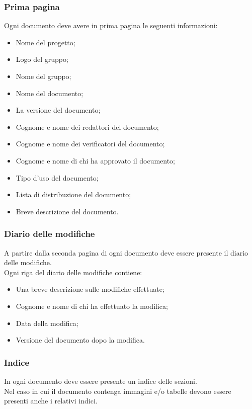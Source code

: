 \subsubsection{Prima pagina}
Ogni documento deve avere in prima pagina le seguenti informazioni:
\begin{itemize}
	\item Nome del progetto;
	\item Logo del gruppo;
	\item Nome del gruppo;
	\item Nome del documento;
	\item La versione del documento;
	\item Cognome e nome dei redattori del documento;
	\item Cognome e nome dei verificatori del documento;
	\item Cognome e nome di chi ha approvato il documento;
	\item Tipo d'uso del documento;
	\item Lista di distribuzione del documento;
	\item Breve descrizione del documento.
\end{itemize}
\subsubsection{Diario delle modifiche}
A partire dalla seconda pagina di ogni documento deve essere presente il diario delle modifiche.\\
Ogni riga del diario delle modifiche contiene:
\begin{itemize}
	\item Una breve descrizione sulle modifiche effettuate;
	\item Cognome e nome di chi ha effettuato la modifica;
	\item Data della modifica;
	\item Versione del documento dopo la modifica.
\end{itemize}

\subsubsection{Indice}
In ogni documento deve essere presente un indice delle sezioni.\\
Nel caso in cui il documento contenga immagini e/o tabelle devono essere presenti anche i relativi indici.

